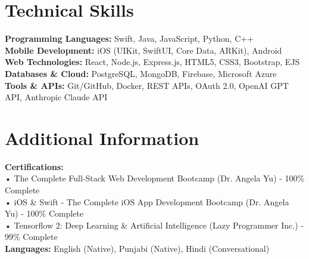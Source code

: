 \documentclass[10pt, letterpaper]{article}
\newenvironment{onecolentry}{
    \begin{adjustwidth}{0.2cm}{0.2cm}
}{
    \end{adjustwidth}
}
\begin{document}
\section{Technical Skills}
\begin{onecolentry}
\textbf{Programming Languages:} Swift, Java, JavaScript, Python, C++ \\
\textbf{Mobile Development:} iOS (UIKit, SwiftUI, Core Data, ARKit), Android \\
\textbf{Web Technologies:} React, Node.js, Express.js, HTML5, CSS3, Bootstrap, EJS \\
\textbf{Databases \& Cloud:} PostgreSQL, MongoDB, Firebase, Microsoft Azure \\
\textbf{Tools \& APIs:} Git/GitHub, Docker, REST APIs, OAuth 2.0, OpenAI GPT API, Anthropic Claude API
\end{onecolentry}


\section{Additional Information}
\textbf{Certifications:} \\
\quad • The Complete Full-Stack Web Development Bootcamp (Dr. Angela Yu) - 100\% Complete \\
\quad • iOS \& Swift - The Complete iOS App Development Bootcamp (Dr. Angela Yu) - 100\% Complete \\
\quad • Tensorflow 2: Deep Learning \& Artificial Intelligence (Lazy Programmer Inc.) - 99\% Complete \\
\textbf{Languages:} English (Native), Punjabi (Native), Hindi (Conversational)
\end{document}
